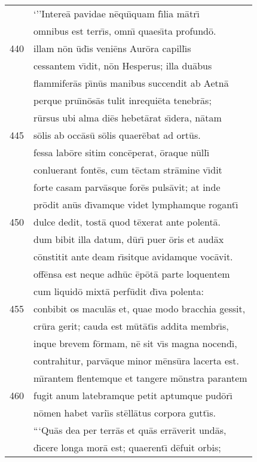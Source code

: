 \documentclass[paper=6in:9in,pagesize=pdftex,
               headinclude=on,footinclude=on,12pt]{scrbook}
\begin{document}
\begin{longtable}[p]{ r l }
 & \indent `''Intere\=a pavidae n\=equ\={\i}quam f\={\i}lia m\=atr\={\i}\\ 
 & omnibus est terr\={\i}s, omn\={\i} quaes\={\i}ta profund\=o.\\ 
440 & illam n\=on \=ud\={\i}s veni\=ens Aur\=ora capill\={\i}s\\ 
 & cessantem v\={\i}dit, n\=on Hesperus; illa du\=abus\\ 
 & flammifer\=as p\={\i}n\=us manibus succendit ab Aetn\=a\\ 
 & perque pru\={\i}n\=os\=as tulit inrequi\=eta tenebr\=as;\\ 
 & r\=ursus ubi alma di\=es hebet\=arat s\={\i}dera, n\=atam\\ 
445 & s\=olis ab occ\=as\=u s\=olis quaer\=ebat ad ort\=us.\\ 
 & fessa lab\=ore sitim conc\=eperat, \=oraque n\=ull\={\i}\\ 
 & conluerant font\=es, cum t\=ectam str\=amine v\={\i}dit\\ 
 & forte casam parv\=asque for\=es puls\=avit; at inde\\ 
 & pr\=odit an\=us d\={\i}vamque videt lymphamque rogant\={\i}\\ 
450 & dulce dedit, tost\=a quod t\=exerat ante polent\=a.\\ 
 & dum bibit illa datum, d\=ur\={\i} puer \=oris et aud\=ax\\ 
 & c\=onstitit ante deam r\={\i}sitque avidamque voc\=avit.\\ 
 & off\=ensa est neque adh\=uc \=ep\=ot\=a parte loquentem\\ 
 & cum liquid\=o mixt\=a perf\=udit d\={\i}va polenta:\\ 
455 & conbibit os macul\=as et, quae modo bracchia gessit,\\ 
 & cr\=ura gerit; cauda est m\=ut\=at\={\i}s addita membr\={\i}s,\\ 
 & inque brevem f\=ormam, n\=e sit v\={\i}s magna nocend\={\i},\\ 
 & contrahitur, parv\=aque minor m\=ens\=ura lacerta est.\\ 
 & m\={\i}rantem flentemque et tangere m\=onstra parantem\\ 
460 & fugit anum latebramque petit aptumque pud\=or\={\i}\\ 
 & n\=omen habet vari\={\i}s st\=ell\=atus corpora gutt\={\i}s.\\ 
 & \indent ```Qu\=as dea per terr\=as et qu\=as err\=averit und\=as,\\ 
 & d\={\i}cere longa mor\=a est; quaerent\={\i} d\=efuit orbis;\\ 

\end{longtable}
\end{document}
